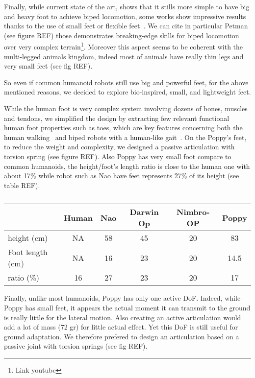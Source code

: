 Finally, while current state of the art, shows that it stills more simple to have big and heavy foot\parencite{REF} to achieve biped locomotion, some works show impressive results thanks to the use of small feet or flexible feet~\parencite{bruneau2001dynamic}. We can cite in particular Petman (see figure REF) those demonstrates breaking-edge skills for biped locomotion over very complex terrain\footnote{Link youtube}.
Moreover this aspect seems to be coherent with the multi-legged animals kingdom, indeed most of animals have really thin legs and very small feet (see fig REF).

So even if common humanoid robots still use big and powerful feet, for the above mentioned reasons, we decided to explore bio-inspired, small, and lightweight feet.

While the human foot is very complex system involving dozens of bones, muscles and tendons, we simplified the design by extracting few relevant functional human foot properties such as toes, which are key features concerning both the human walking~\cite{Hughes1990} and biped robots with a human-like gait~\cite{Sellaouti2006}. On the Poppy's feet, to reduce the weight and complexity, we designed a passive articulation with torsion spring (see figure REF).
Also Poppy has very small foot compare to common humanoids, the height/foot's length ratio is close to the human one with about 17\% while robot such as Nao have feet represents 27\% of its height (see table REF).

\begin{table}[h]
\centering
\begin{tabular}{l| c c c c c}
    & Human & Nao & Darwin Op & Nimbro-OP & Poppy \\
    \hline
    height (cm) & NA & 58 & 45 & 20 & 83\\
    Foot length (cm) & NA & 16 & 23 & 20 & 14.5\\
    ratio (\%) & 16 & 27 & 23 & 20 & 17\\
\end{tabular}
\caption{}
\label{tab:poppy_feet_compare}
\end{table}

Finally, unlike most humanoids, Poppy has only one active DoF. Indeed, while Poppy has small feet, it appears the actual moment it can transmit to the ground is really little for the lateral motion. Also creating an active articulation would add a lot of mass (72 gr) for little actual effect. Yet this DoF is still useful for ground adaptation. We therefore prefered to design an articulation based on a passive joint with torsion springs (see fig REF).


